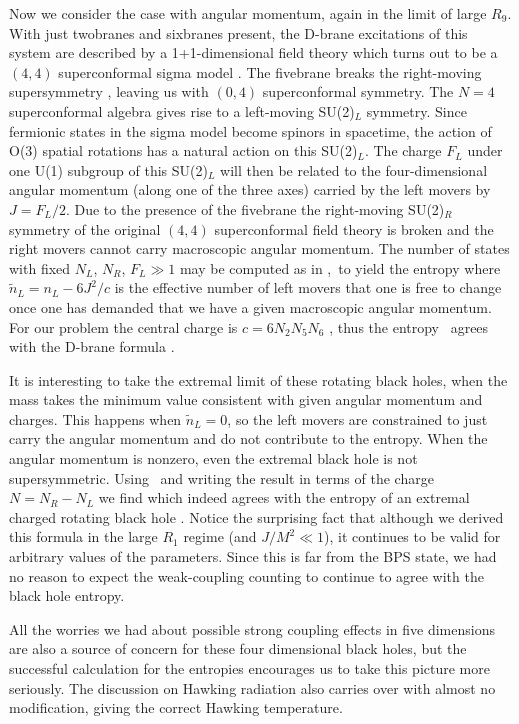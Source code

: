 Now we consider the case with angular momentum, again
in the limit of large $R_9$. 
With just twobranes and sixbranes present,
the D-brane excitations of this system are described
by a 1+1-dimensional field theory which turns out to be a
$(4,4)$ superconformal sigma model \spn .
The fivebrane breaks the right-moving supersymmetry
\harstro ,
leaving us with $(0,4)$ superconformal symmetry.
The $N=4$ superconformal algebra gives rise to
a left-moving  SU(2)$_L$ symmetry. Since fermionic
states in the sigma model become spinors in spacetime, the action
of O(3) spatial rotations has a natural
action on this SU(2)$_L$. The charge $F_L$ under
one  U(1) subgroup of this SU(2)$_L$  will then be
related to the four-dimensional angular
momentum (along one of the three axes)
 carried by the left movers by $J= F_L /2 $.
Due to the presence of the fivebrane the right-moving SU(2)$_R$
symmetry of the original $(4,4)$ superconformal field theory is broken and
the right movers cannot carry macroscopic angular
momentum.
The number of states with fixed
$N_L$, $N_R$, $F_L\gg 1$ may be computed as in
\spn ,\vbd\ to yield the entropy
\eqn{}
where $\tilde n_L = n_L-
6 J^2/ c$ is the effective number of left movers that
one is free to change once one has demanded that
we have a given macroscopic angular momentum.
For our problem the central
charge is $c=6 N_2 N_5 N_6$ \ms, thus the
entropy \neent\ agrees with the D-brane formula
\dent .

It is interesting to take the extremal limit of these rotating
black holes, when the mass takes the minimum value consistent with
given angular momentum and charges. This happens when
$\tilde n_L =0 $, so the left movers are constrained to just carry the 
angular
momentum and do not contribute
to the entropy.
When the angular momentum is nonzero, even the extremal black hole is not
supersymmetric.
Using \dent\ and writing the result in
terms of the charge $N = N_R - N_L $ we find
\eqn{}
which indeed agrees with the entropy of an extremal
charged rotating black hole \cveticang .
Notice the surprising fact that although  we derived this formula
in the large $R_1$ regime (and  $J/M^2 \ll 1$), it continues to
be valid for arbitrary values of the parameters.
Since this is far from the BPS state, we had no reason to expect the
weak-coupling counting to continue to agree  with the black hole
entropy.

All the worries we had about possible strong coupling effects 
in five dimensions
are also a source of concern for these four dimensional black 
holes, but the successful calculation for the entropies 
encourages us to take this picture more seriously.
The discussion on Hawking radiation also carries 
over with almost no modification, giving the correct 
Hawking temperature.



